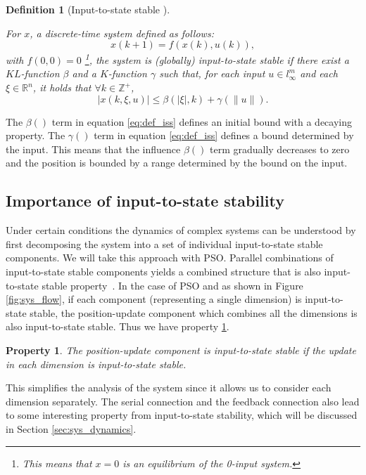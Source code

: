 \documentclass{sig-alternate}
\newtheorem{mydef}{Definition}
\newtheorem{myprop}{Property}
\begin{document}
\begin{mydef}[Input-to-state stable \cite{Jiang2001857}]
\label{def:iss}

For $ x $, a discrete-time system defined as follows:
\begin{equation}
\label{eq:dis_nonlinear}
x(k+1) = f( x(k) , u(k) ),
\end{equation}
with $ f(0,0) = 0 $
\footnote{This means that $ x = 0 $ is an equilibrium of the 0-input system.}, the system is \emph{(globally) input-to-state stable} if there exist a $ KL $-function $ \beta  $ and a $ K $-function $ \gamma $ such that, for each input $ u \in l^{m}_{\infty} $ and each $ \xi \in \mathbb{R}^{n} $, it holds that $  \forall k \in \mathbb{Z}^{+} $,
\begin{equation}
\label{eq:def_iss}
| x(k, \xi, u) | \leq \beta (| \xi |, k) + \gamma (\lVert u \rVert).
\end{equation}
\end{mydef}

The $ \beta () $ term in equation \eqref{eq:def_iss} defines an initial bound with a decaying property.
The $ \gamma () $ term in equation \eqref{eq:def_iss} defines a bound determined by the input.
This means that the influence $ \beta () $ term gradually decreases to zero and the position is bounded by a range determined by the bound on the input.

\subsection{Importance of input-to-state stability}
\label{sec:connect_iss_to_pso}

Under certain conditions the dynamics of complex systems can be understood by first decomposing the system into a set of individual input-to-state stable components. We will take this approach with PSO. 
Parallel combinations of input-to-state stable components yields a combined structure that is also input-to-state stable property~\cite{khalil1996nonlinear}.
In the case of PSO and as shown in Figure \ref{fig:sys_flow}, if each component (representing a single dimension) is input-to-state stable, the position-update component which combines all the dimensions is also input-to-state stable.
Thus we have property \ref{prop:iss:parallel}.
\begin{myprop}
\label{prop:iss:parallel}
The position-update component is input-to-state stable if the update in each dimension is input-to-state stable.
\end{myprop}
This simplifies the analysis of the system since it allows us to consider each dimension separately.
The serial connection and the feedback connection also lead to some interesting property from input-to-state stability, which will be discussed in Section \ref{sec:sys_dynamics}.
\end{document}
